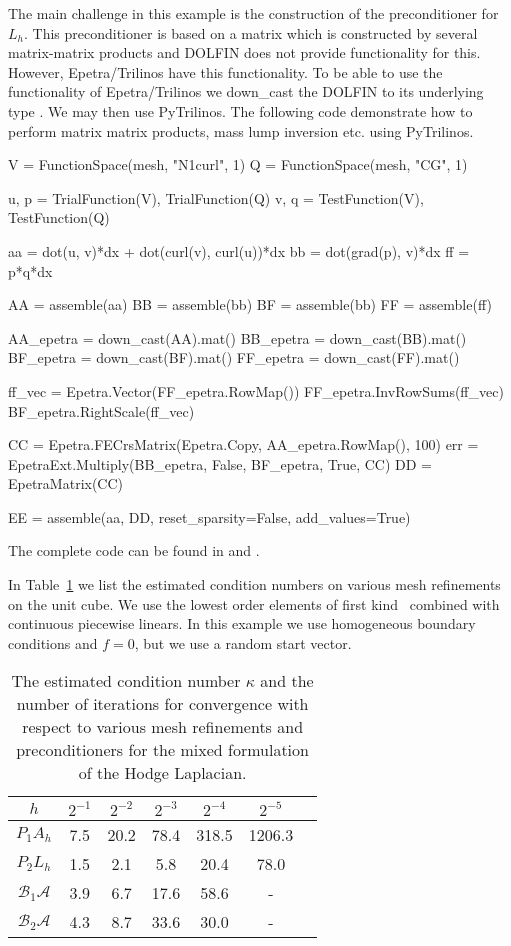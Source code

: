 The main challenge in this example is the construction of the
preconditioner for $L_h$. This preconditioner is based on a matrix
which is constructed by several matrix-matrix products and DOLFIN does
not provide functionality for this. However, Epetra/Trilinos have this
functionality. To be able to use the functionality of Epetra/Trilinos
we down\_cast the DOLFIN  to its underlying
type . We may then use PyTrilinos.  The
following code demonstrate how to perform matrix matrix products, mass
lump inversion etc. using PyTrilinos.
\begin{python}
V = FunctionSpace(mesh, "N1curl", 1)
Q = FunctionSpace(mesh, "CG", 1)

u, p = TrialFunction(V), TrialFunction(Q)
v, q = TestFunction(V), TestFunction(Q)

aa = dot(u, v)*dx + dot(curl(v), curl(u))*dx
bb = dot(grad(p), v)*dx
ff = p*q*dx

AA = assemble(aa)
BB = assemble(bb)
BF = assemble(bb)
FF = assemble(ff)

AA_epetra = down_cast(AA).mat()
BB_epetra = down_cast(BB).mat()
BF_epetra = down_cast(BF).mat()
FF_epetra = down_cast(FF).mat()

ff_vec = Epetra.Vector(FF_epetra.RowMap())
FF_epetra.InvRowSums(ff_vec)
BF_epetra.RightScale(ff_vec)

CC = Epetra.FECrsMatrix(Epetra.Copy, AA_epetra.RowMap(), 100)
err = EpetraExt.Multiply(BB_epetra, False, BF_epetra, True, CC)
DD = EpetraMatrix(CC)

EE = assemble(aa, DD, reset_sparsity=False, add_values=True)
\end{python}
The complete code can be found in  and .

In Table~\ref{table:hodge} we list the estimated condition numbers on
various mesh refinements on the unit cube. We use the lowest
order \nedelec{} elements of first kind~\citep{Nedelec1980} combined
with continuous piecewise linears. In this example we use homogeneous
boundary conditions and $f=0$, but we use a random start vector.
\begin{table}
\begin{center}
\begin{tabular}{|c||c|c|c|c|c|c|}
\hline
$h$ & $2^{-1}$ & $2^{-2}$ & $2^{-3}$ & $2^{-4}$  & $2^{-5}$ \\ \hline
$ P_1 A_h$ & 7.5 & 20.2 & 78.4 & 318.5 & 1206.3 \\ \hline
$ P_2 L_h$ & 1.5 & 2.1  & 5.8  & 20.4 & 78.0 \\ \hline
$\mathcal{B}_1 \mathcal{A}$ & 3.9 & 6.7 & 17.6 & 58.6 & - \\ \hline
$\mathcal{B}_2 \mathcal{A}$ & 4.3 & 8.7 & 33.6 & 30.0 & - \\ \hline
\end{tabular}
\caption{The estimated condition number $\kappa$ and the number of iterations for
  convergence with respect to various mesh refinements and preconditioners for the mixed formulation of the Hodge Laplacian.}  \label{table:hodge}
\end{center}
\end{table}

